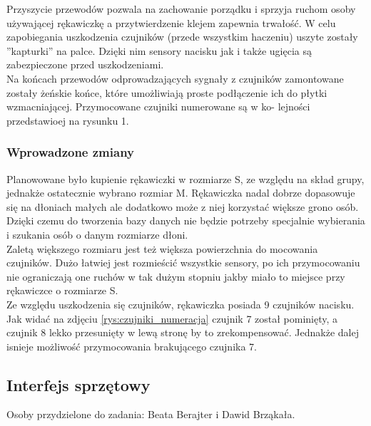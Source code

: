 \documentclass{article}
\begin{document}
Przyszycie przewodów pozwala na zachowanie porządku i sprzyja ruchom osoby używającej rękawiczkę a
przytwierdzenie klejem zapewnia trwałość. W celu zapobiegania uszkodzenia czujników (przede wszystkim
haczeniu) uszyte zostały ”kapturki” na palce. Dzięki nim sensory nacisku jak i także ugięcia są zabezpieczone
przed uszkodzeniami.\\
Na końcach przewodów odprowadzających sygnały z czujników zamontowane zostały żeńskie końce, które
umożliwiają proste podłączenie ich do płytki wzmacniającej. Przymocowane czujniki numerowane są w ko-
lejności przedstawioej na rysunku 1.\\

\subsubsection{Wprowadzone zmiany}
Planowowane było kupienie rękawiczki w rozmiarze S, ze względu na skład grupy, jednakże ostatecznie wybrano rozmiar M. Rękawiczka nadal dobrze dopasowuje się na dłoniach małych ale dodatkowo może z niej korzystać większe grono osób. Dzięki czemu do tworzenia bazy danych nie będzie potrzeby specjalnie wybierania i szukania osób o danym rozmiarze dłoni.\\
Zaletą większego rozmiaru jest też większa powierzchnia do mocowania czujników. Dużo łatwiej jest rozmieścić wszystkie sensory, po ich przymocowaniu nie ograniczają one ruchów w tak dużym stopniu jakby miało to miejsce przy rękawiczce o rozmiarze S.\\
Ze względu uszkodzenia się czujników, rękawiczka posiada 9 czujników nacisku. Jak widać na zdjęciu \ref{rys:czujniki_numeracja} czujnik 7 został pominięty, a czujnik 8 lekko przesunięty w lewą stronę by to zrekompensować. Jednakże dalej isnieje możliwość przymocowania brakującego czujnika 7.

\subsection{Interfejs sprzętowy}

Osoby przydzielone do zadania: Beata Berajter i Dawid Brząkała. \\
\end{document}
